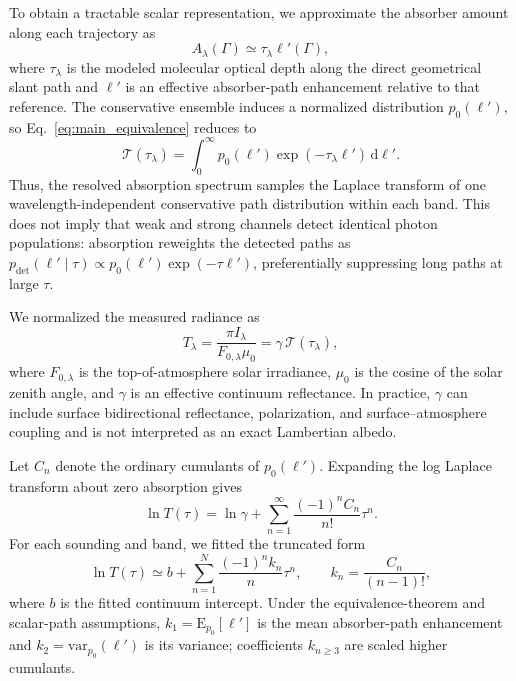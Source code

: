 To obtain a tractable scalar representation, we approximate the absorber amount
along each trajectory as
\begin{equation}
  A_\lambda(\Gamma)
  \simeq \tau_\lambda\ell'(\Gamma),
  \label{eq:main_scalar_path}
\end{equation}
where $\tau_\lambda$ is the modeled molecular optical depth along the direct
geometrical slant path and $\ell'$ is an effective absorber-path enhancement
relative to that reference.  The conservative ensemble induces a normalized
distribution $p_0(\ell')$, so Eq.~\eqref{eq:main_equivalence} reduces to
\begin{equation}
  \mathcal T(\tau_\lambda)
  = \int_0^\infty p_0(\ell')
      \exp(-\tau_\lambda\ell')\,\mathrm{d}\ell'.
  \label{eq:main_laplace}
\end{equation}
Thus, the resolved absorption spectrum samples the Laplace transform of one
wavelength-independent conservative path distribution within each band.  This
does not imply that weak and strong channels detect identical photon
populations: absorption reweights the detected paths as
$p_{\mathrm{det}}(\ell'\mid\tau)\propto
p_0(\ell')\exp(-\tau\ell')$, preferentially suppressing long paths at large
$\tau$.

We normalized the measured radiance as
\begin{equation}
  T_\lambda
  = \frac{\pi I_\lambda}{F_{0,\lambda}\mu_0}
  = \gamma\,\mathcal T(\tau_\lambda),
  \label{eq:main_transmittance}
\end{equation}
where $F_{0,\lambda}$ is the top-of-atmosphere solar irradiance, $\mu_0$ is the
cosine of the solar zenith angle, and $\gamma$ is an effective continuum
reflectance.  In practice, $\gamma$ can include surface bidirectional
reflectance, polarization, and surface--atmosphere coupling and is not
interpreted as an exact Lambertian albedo.

Let $C_n$ denote the ordinary cumulants of $p_0(\ell')$.  Expanding the log
Laplace transform about zero absorption gives
\begin{equation}
  \ln T(\tau)
  = \ln\gamma
    + \sum_{n=1}^{\infty}
      \frac{(-1)^n C_n}{n!}\tau^n.
  \label{eq:main_cumulant}
\end{equation}
For each sounding and band, we fitted the truncated form
\begin{equation}
  \ln T(\tau)
  \simeq b
    + \sum_{n=1}^{N}
      \frac{(-1)^n k_n}{n}\tau^n,
  \qquad
  k_n=\frac{C_n}{(n-1)!},
  \label{eq:main_fit}
\end{equation}
where $b$ is the fitted continuum intercept.  Under the equivalence-theorem and
scalar-path assumptions, $k_1=\mathrm{E}_{p_0}[\ell']$ is the mean absorber-path
enhancement and $k_2=\mathrm{var}_{p_0}(\ell')$ is its variance; coefficients
$k_{n\geq3}$ are scaled higher cumulants.

